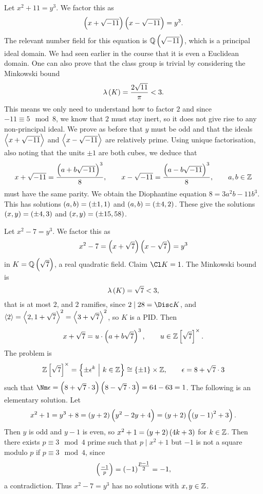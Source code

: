 \begin{example*}
Let $ x^2 + 11 = y^3 $. We factor this as
$$ \br{x + \sqrt{-11}}\br{x - \sqrt{-11}} = y^3. $$
The relevant number field for this equation is $ \QQ\br{\sqrt{-11}} $, which is a principal ideal domain. We had seen earlier in the course that it is even a Euclidean domain. One can also prove that the class group is trivial by considering the Minkowski bound
$$ \lambda\br{K} = \dfrac{2\sqrt{11}}{\pi} < 3. $$
This means we only need to understand how to factor $ 2 $ and since $ -11 \equiv 5 \mod 8 $, we know that $ 2 $ must stay inert, so it does not give rise to any non-principal ideal. We prove as before that $ y $ must be odd and that the ideals $ \left\langle x + \sqrt{-11} \right\rangle $ and $ \left\langle x - \sqrt{-11} \right\rangle $ are relatively prime. Using unique factorisation, also noting that the units $ \pm 1 $ are both cubes, we deduce that
$$ x + \sqrt{-11} = \dfrac{\br{a + b\sqrt{-11}}^3}{8}, \qquad x - \sqrt{-11} = \dfrac{\br{a - b\sqrt{-11}}^3}{8}, \qquad a, b \in \ZZ $$
must have the same parity. We obtain the Diophantine equation $ 8 = 3a^2b - 11b^3 $. This has solutions $ \br{a, b} = \br{\pm 1, 1} $ and $ \br{a, b} = \br{\pm 4, 2} $. These give the solutions $ \br{x, y} = \br{\pm 4, 3} $ and $ \br{x, y} = \br{\pm 15, 58} $.
\end{example*}

\begin{example*}
Let $ x^2 - 7 = y^3 $. We factor this as
$$ x^2 - 7 = \br{x + \sqrt{7}}\br{x - \sqrt{7}} = y^3 $$
in $ K = \QQ\br{\sqrt{7}} $, a real quadratic field. Claim $ \Cl K = 1 $. The Minkowski bound is
$$ \lambda\br{K} = \sqrt{7} < 3, $$
that is at most $ 2 $, and $ 2 $ ramifies, since $ 2 \mid 28 = \Disc K $, and $ \left\langle 2 \right\rangle = \left\langle 2, 1 + \sqrt{7} \right\rangle^2 = \left\langle 3 + \sqrt{7} \right\rangle^2 $, so $ K $ is a PID. Then
$$ x + \sqrt{7} = u \cdot \br{a + b\sqrt{7}}^3, \qquad u \in \ZZ\sbr{\sqrt{7}}^\times. $$
The problem is
$$ \ZZ\sbr{\sqrt{7}}^\times = \cbr{\pm\epsilon^k \st k \in \ZZ} \cong \cbr{\pm 1} \times \ZZ, \qquad \epsilon = 8 + \sqrt{7} \cdot 3 $$
such that $ \Nm \epsilon = \br{8 + \sqrt{7} \cdot 3}\br{8 - \sqrt{7} \cdot 3} = 64 - 63 = 1 $. The following is an elementary solution. Let
$$ x^2 + 1 = y^3 + 8 = \br{y + 2}\br{y^2 - 2y + 4} = \br{y + 2}\br{\br{y - 1}^2 + 3}. $$
Then $ y $ is odd and $ y - 1 $ is even, so $ x^2 + 1 = \br{y + 2}\br{4k + 3} $ for $ k \in \mathbb{Z} $. Then there exists $ p \equiv 3 \mod 4 $ prime such that $ p \mid x^2 + 1 $ but $ -1 $ is not a square modulo $ p $ if $ p \equiv 3 \mod 4 $, since
$$ \symbol{-1}{p} = \br{-1}^{\tfrac{p - 1}{2}} = -1, $$
a contradiction. Thus $ x^2 - 7 = y^3 $ has no solutions with $ x, y \in \mathbb{Z} $.
\end{example*}

